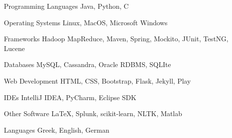 

\begin{cvskills}

  \cvskill
    {Programming Languages} %
    {Java, Python, C} %

  \cvskill
    {Operating Systems} %
    {Linux, MacOS, Microsoft Windows} %
    
  \cvskill
    {Frameworks} %
    {Hadoop MapReduce, Maven, Spring, Mockito, JUnit, TestNG, Lucene} %

  \cvskill
    {Databases} %
    {MySQL, Cassandra, Oracle RDBMS, SQLIte} %

  \cvskill
    {Web Development} %
    {HTML, CSS, Bootstrap, Flask, Jekyll, Play} %

  \cvskill
    {IDEs} %
    {IntelliJ IDEA, PyCharm, Eclipse SDK} %

  \cvskill
    {Other Software} %
    {LaTeX, Splunk, scikit-learn, NLTK, Matlab} %

  \cvskill
    {Languages} %
    {Greek, English, German} %

\end{cvskills}
